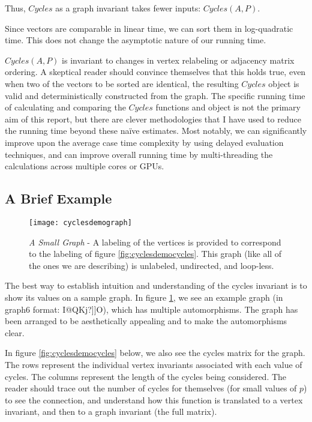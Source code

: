 Thus, $Cycles$ as a graph invariant takes fewer inputs: $Cycles(A, P)$.

Since vectors are comparable in linear time, we can sort them in log-quadratic time.
This does not change the asymptotic nature of our running time.

$Cycles(A, P)$ is invariant to changes in vertex relabeling or adjacency matrix ordering.
A skeptical reader should convince themselves that this holds true, even when two of the vectors to be sorted are identical, the resulting $Cycles$ object is valid and deterministically constructed from the graph.
The specific running time of calculating and comparing the $Cycles$ functions and object is not the primary aim of this report, but there are clever methodologies that I have used to reduce the running time beyond these na\"{i}ve estimates.
Most notably, we can significantly improve upon the average case time complexity by using delayed evaluation techniques, and can improve overall running time by multi-threading the calculations across multiple cores or GPUs.

\subsection{A Brief Example}

\begin{figure}[h]
\caption{\emph{A Small Graph} - A labeling of the vertices is provided to correspond to the labeling of figure \ref{fig:cyclesdemocycles}. This graph (like all of the ones we are describing) is unlabeled, undirected, and loop-less.}
\centering
\texttt{[image: cyclesdemograph]}
\label{fig:cyclesdemograph}
\end{figure}

The best way to establish intuition and understanding of the cycles invariant is to show its values on a sample graph.
In figure \ref{fig:cyclesdemograph}, we see an example graph (in graph6 format: I@QKj?]]O), which has multiple automorphisms.
The graph has been arranged to be aesthetically appealing and to make the automorphisms clear.

In figure \ref{fig:cyclesdemocycles} below, we also see the cycles matrix for the graph.
The rows represent the individual vertex invariants associated with each value of cycles.
The columns represent the length of the cycles being considered.
The reader should trace out the number of cycles for themselves (for small values of $p$) to see the connection, and understand how this function is translated to a vertex invariant, and then to a graph invariant (the full matrix).

